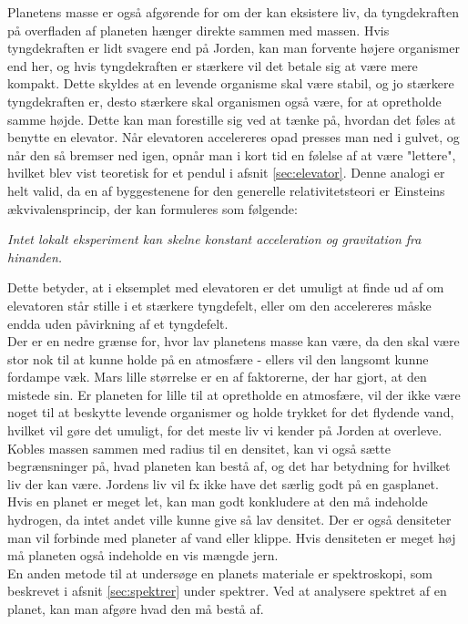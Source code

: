 Planetens masse er også afgørende for om der kan eksistere liv, da tyngdekraften på overfladen af planeten hænger direkte sammen med massen. Hvis tyngdekraften er lidt svagere end på Jorden, kan man forvente højere organismer end her, og hvis tyngdekraften er stærkere vil det betale sig at være mere kompakt. Dette skyldes at en levende organisme skal være stabil, og jo stærkere tyngdekraften er, desto stærkere skal organismen også være, for at opretholde samme højde. Dette kan man forestille sig ved at tænke på, hvordan det føles at benytte en elevator. Når elevatoren accelereres opad presses man ned i gulvet, og når den så bremser ned igen, opnår man i kort tid en følelse af at være "lettere", hvilket blev vist teoretisk for et pendul i afsnit \ref{sec:elevator}. Denne analogi er helt valid, da en af byggestenene for den generelle relativitetsteori er Einsteins ækvivalensprincip, der kan formuleres som følgende:
\begin{center}
    \textit{Intet lokalt eksperiment kan skelne konstant acceleration og gravitation fra hinanden.}
\end{center}
Dette betyder, at i eksemplet med elevatoren er det umuligt at finde ud af om elevatoren står stille i et stærkere tyngdefelt, eller om den accelereres måske endda uden påvirkning af et tyngdefelt. \\
Der er en nedre grænse for, hvor lav planetens masse kan være, da den skal være stor nok til at kunne holde på en atmosfære - ellers vil den langsomt kunne fordampe væk. Mars lille størrelse er en af faktorerne, der har gjort, at den mistede sin. %
Er planeten for lille til at opretholde en atmosfære, vil der ikke være noget til at beskytte levende organismer og holde trykket for det flydende vand, hvilket vil gøre det umuligt, for det meste liv vi kender på Jorden at overleve. \\

Kobles massen sammen med radius til en densitet, kan vi også sætte begrænsninger på, hvad planeten kan bestå af, og det har betydning for hvilket liv der kan være. Jordens liv vil fx ikke have det særlig godt på en gasplanet. Hvis en planet er meget let, kan man godt konkludere at den må indeholde hydrogen, da intet andet ville kunne give så lav densitet. Der er også densiteter man vil forbinde med planeter af vand eller klippe. Hvis densiteten er meget høj må planeten også indeholde en vis mængde jern. \\
En anden metode til at undersøge en planets materiale er spektroskopi, som beskrevet i afsnit \ref{sec:spektrer} under spektrer. Ved at analysere spektret af en planet, kan man afgøre hvad den må bestå af.\\

